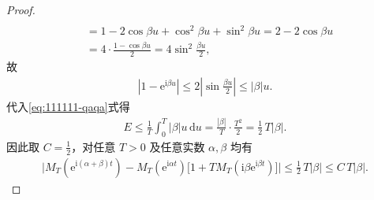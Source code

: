 \documentclass[../../main.tex]{subfiles}%
\begin{document}
\begin{proof}
\begin{align*}
\\
&=1-2\cos \beta u+\cos ^2\beta u+\sin ^2\beta u=2-2\cos \beta u
\\
&=4\cdot \frac{1-\cos \beta u}{2}=4\sin ^2\frac{\beta u}{2},
\end{align*}
故
\begin{align*}
\left| 1-\mathrm{e}^{\mathrm{i}\beta u} \right|\leqslant 2\left| \sin \frac{\beta u}{2} \right|\leqslant \left| \beta \right|u.
\end{align*}
代入\eqref{eq:111111-qaqa}式得
\begin{align*}
E \leqslant \frac{1}{T}\int_0^T |\beta| u\,\mathrm{d}u = \frac{|\beta|}{T}\cdot\frac{T^2}{2} = \frac{1}{2}\,T|\beta|.
\end{align*}
因此取 $C = \frac{1}{2}$，对任意 $T>0$ 及任意实数 $\alpha,\beta$ 均有
\begin{align*}
\bigl| M_T(\mathrm{e}^{\mathrm{i}(\alpha+\beta)t}) - M_T(\mathrm{e}^{\mathrm{i}\alpha t})\bigl[1 + T M_T(\mathrm{i}\beta \mathrm{e}^{\mathrm{i}\beta t})\bigr] \bigr|
\leqslant \frac{1}{2}\,T|\beta| \leqslant C\,T|\beta|.
\end{align*}
\end{proof}
\end{document}
